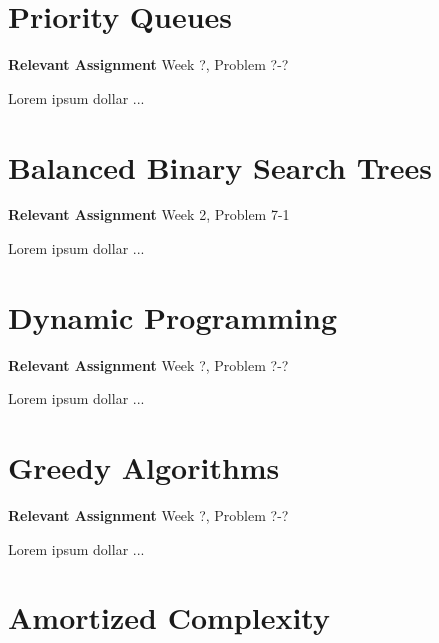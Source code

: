 \documentclass[11pt,english]{book}
\begin{document}

\chapter{Priority Queues}
\label{ch:priorityqueyes}

\textbf{Relevant Assignment} Week ?, Problem ?-?
\vspace{0.38in}

\noindent Lorem ipsum dollar ...



\chapter{Balanced Binary Search Trees}
\label{ch:bbstrees}

\textbf{Relevant Assignment} Week 2, Problem 7-1
\vspace{0.38in}

\noindent Lorem ipsum dollar ...



\chapter{Dynamic Programming}
\label{ch:dynamicprog}

\textbf{Relevant Assignment} Week ?, Problem ?-?
\vspace{0.38in}

\noindent Lorem ipsum dollar ...



\chapter{Greedy Algorithms}
\label{ch:greedyalg}

\textbf{Relevant Assignment} Week ?, Problem ?-?
\vspace{0.38in}

\noindent Lorem ipsum dollar ...



\chapter{Amortized Complexity}
\label{ch:amortized}
\end{document}
